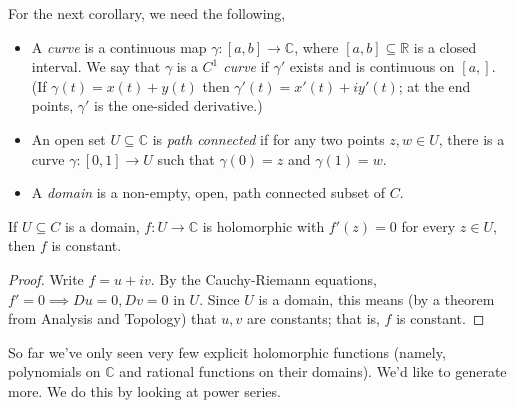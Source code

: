 For the next corollary, we need the following,
\begin{definition}
    \leavevmode
    \begin{itemize}
        \item A \textit{curve} is a continuous map \(\gamma: [a,b] \to \mathbb{C}\), where \([a,b]\subseteq \mathbb{R}\) is a closed interval. We say that \(\gamma\) is a \textit{\(C^1\) curve} if \(\gamma'\) exists and is continuous on \([a,]\). (If \(\gamma(t) = x(t) + y(t)\) then \(\gamma'(t) = x'(t) + iy'(t)\); at the end points, \(\gamma'\) is the one-sided derivative.)
        \item An open set \(U \subseteq \mathbb{C}\) is \textit{path connected} if for any two points \(z,w \in U\), there is a curve \(\gamma: [0,1] \to U\) such that \(\gamma(0) = z\) and \(\gamma(1) = w\).
        \item A \textit{domain} is a non-empty, open, path connected subset of \(C\).
    \end{itemize}
\end{definition}
\begin{corollary}
    If \(U\subseteq C\) is a domain, \(f: U\to \mathbb{C}\) is holomorphic with \(f'(z) = 0\) for every \(z \in U\), then \(f\) is constant.
\end{corollary}
\begin{proof}
    Write \(f = u + iv\). By the Cauchy-Riemann equations, \(f'=0 \implies Du = 0, Dv=0\) in \(U\). Since \(U\) is a domain, this means (by a theorem from Analysis and Topology) that \(u,v\) are constants; that is, \(f\) is constant.
\end{proof}
So far we've only seen very few explicit holomorphic functions (namely, polynomials on \(\mathbb{C}\) and rational functions on their domains). We'd like to generate more. We do this by looking at power series.

